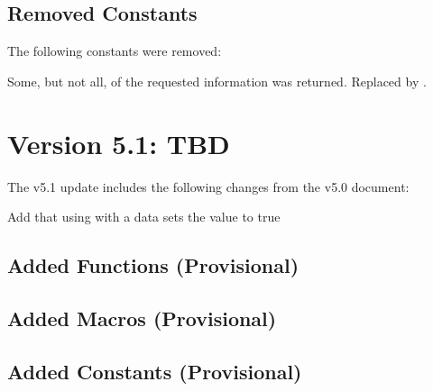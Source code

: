 \subsection{Removed Constants}

The following constants were removed:

\begin{constantdesc}
Some, but not all, of the requested information was returned.
Replaced by .
\end{constantdesc}

\section{Version 5.1: TBD}

The v5.1 update includes the following changes from the v5.0 document:

\begin{compactitemize}
  \item Add that using  with a   data sets the value to true
\end{compactitemize}

\subsection{Added Functions (Provisional)}


\subsection{Added Macros (Provisional)}


\subsection{Added Constants (Provisional)}



